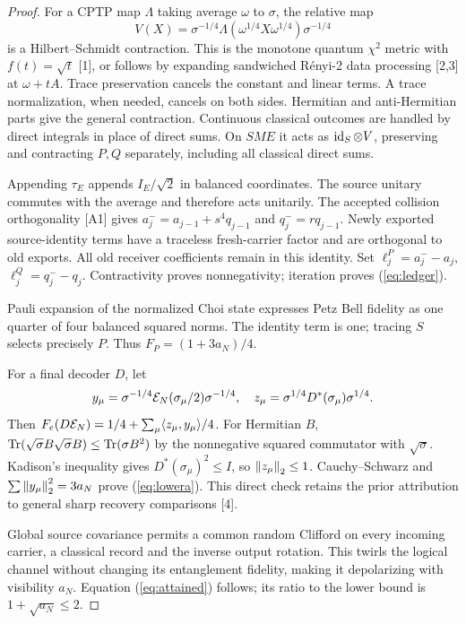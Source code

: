 \begin{proof}
For a CPTP map $\Lambda$ taking average $\omega$ to $\sigma$, the relative map
\[
 V(X)=\sigma^{-1/4}\Lambda(\omega^{1/4}X\omega^{1/4})\sigma^{-1/4}
\]
is a Hilbert--Schmidt contraction. This is the monotone quantum $\chi^2$ metric
with $f(t)=\sqrt t$ [1], or follows by expanding sandwiched R\'enyi-2 data
processing [2,3] at $\omega+tA$. Trace preservation cancels the constant and
linear terms. A trace normalization, when needed, cancels on both sides.
Hermitian and anti-Hermitian parts give the general contraction. Continuous
classical outcomes are handled by direct integrals in place of direct sums.
On $SME$ it acts as $\operatorname{id}_S\otimes V$, preserving and contracting $P,Q$
separately, including all classical direct sums.

Appending $\tau_E$ appends $I_E/\sqrt2$ in balanced coordinates. The source
unitary commutes with the average and therefore acts unitarily. The accepted
collision orthogonality [A1] gives
$a_j^-=a_{j-1}+s^4q_{j-1}$ and $q_j^-=rq_{j-1}$. Newly exported
source-identity terms have a traceless fresh-carrier factor and are orthogonal
to old exports. All old receiver coefficients remain in this identity. Set
$\ell_j^P=a_j^--a_j$, $\ell_j^Q=q_j^--q_j$. Contractivity proves
nonnegativity; iteration proves (\ref{eq:ledger}).

Pauli expansion of the normalized Choi state expresses Petz Bell fidelity as
one quarter of four balanced squared norms. The identity term is one;
tracing $S$ selects precisely $P$. Thus $F_P=(1+3a_N)/4$.

For a final decoder $D$, let
\[
 y_\mu=\sigma^{-1/4}\mathcal E_N(\sigma_\mu/2)\sigma^{-1/4},\quad
 z_\mu=\sigma^{1/4}D^*(\sigma_\mu)\sigma^{1/4}.
\]
Then $F_e(D\mathcal E_N)=1/4+\sum_\mu\langle z_\mu,y_\mu\rangle/4$.
For Hermitian $B$, $\operatorname{Tr}(\sqrt\sigma B\sqrt\sigma B)\le\operatorname{Tr}(\sigma B^2)$
by the nonnegative squared commutator with $\sqrt\sigma$. Kadison's inequality
gives $D^*(\sigma_\mu)^2\le I$, so $\left\lVert z_\mu\right\rVert_2\le1$.
Cauchy--Schwarz and $\sum\left\lVert y_\mu\right\rVert_2^2=3a_N$ prove
(\ref{eq:lowera}). This direct check retains the prior attribution to general
sharp recovery comparisons [4].

Global source covariance permits a common random Clifford on every incoming
carrier, a classical record and the inverse output rotation. This twirls the
logical channel without changing its entanglement fidelity, making it
depolarizing with visibility $a_N$. Equation (\ref{eq:attained}) follows; its
ratio to the lower bound is $1+\sqrt{a_N}\le2$.
\end{proof}

